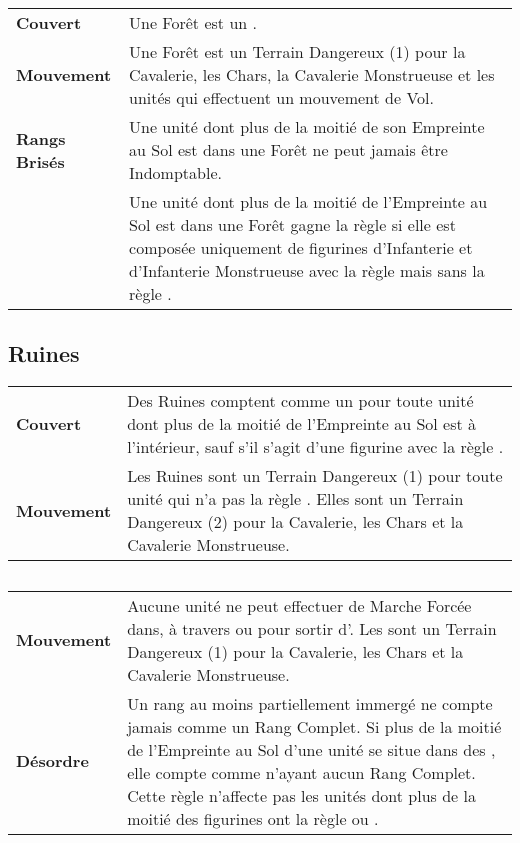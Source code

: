 \noindent\begin{tabular}{>{\bfseries\raggedleft}p{2.2cm}p{13.5cm}}
Couvert & Une Forêt est un \softterrain{}. \tabularnewline
Mouvement & Une Forêt est un Terrain Dangereux (1) pour la Cavalerie, les Chars, la Cavalerie Monstrueuse et les unités qui effectuent un mouvement de Vol. \tabularnewline
Rangs Brisés & Une unité dont plus de la moitié de son Empreinte au Sol est dans une Forêt ne peut jamais être Indomptable. \tabularnewline
\stubborn{} & Une unité dont plus de la moitié de l'Empreinte au Sol est dans une Forêt gagne la règle \stubborn{} si elle est composée uniquement de figurines d'Infanterie et d'Infanterie Monstrueuse avec la règle \lighttroops{} mais sans la règle \fly{}. \tabularnewline
\end{tabular}

\hypertarget{ruins}{\subsection{Ruines}}

\noindent\begin{tabular}{>{\bfseries\raggedleft}p{2.2cm}p{13.5cm}}
Couvert & Des Ruines comptent comme un \hardterrain{} pour toute unité dont plus de la moitié de l'Empreinte au Sol est à l'intérieur, sauf s'il s'agit d'une figurine avec la règle \toweringpresence{}. \tabularnewline
Mouvement & Les Ruines sont un Terrain Dangereux (1) pour toute unité qui n'a pas la règle \skirmisher{}. Elles sont un Terrain Dangereux (2) pour la Cavalerie, les Chars et la Cavalerie Monstrueuse. \tabularnewline
\end{tabular}

\hypertarget{water}{\subsection{\water}}

\noindent\begin{tabular}{>{\bfseries\raggedleft}p{2.2cm}p{13.5cm}}
Mouvement & Aucune unité ne peut effectuer de Marche Forcée dans, à travers ou pour sortir d'\water{}. Les \water{} sont un Terrain Dangereux (1) pour la Cavalerie, les Chars et la Cavalerie Monstrueuse. \tabularnewline
Désordre & Un rang au moins partiellement immergé ne compte jamais comme un Rang Complet. Si plus de la moitié de l'Empreinte au Sol d'une unité se situe dans des \water{}, elle compte comme n'ayant aucun Rang Complet. Cette règle n'affecte pas les unités dont plus de la moitié des figurines ont la règle \strider{} ou \strider{\water}. \tabularnewline
\end{tabular}

